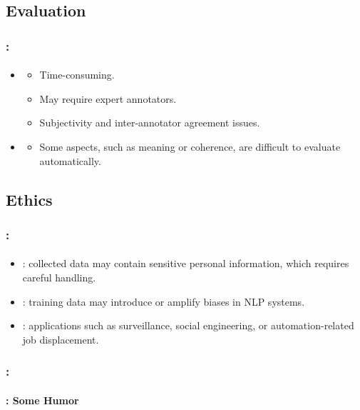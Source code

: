 \documentclass[xcolor=table]{beamer}
\begin{document}
\subsection{Evaluation}

\begin{frame}
	\frametitle{\insertshortsubtitle: \insertsection}
	\framesubtitle{\insertsubsection}
	
	\begin{itemize}
		\item {}
		\begin{itemize}
			\item Time-consuming.
			\item May require expert annotators.
			\item Subjectivity and inter-annotator agreement issues.
		\end{itemize}
		
		\item {}
		\begin{itemize}
			\item Some aspects, such as meaning or coherence, are difficult to evaluate automatically.
		\end{itemize}
	\end{itemize}

\end{frame}

\subsection{Ethics}

\begin{frame}
	\frametitle{\insertshortsubtitle: \insertsection}
	\framesubtitle{\insertsubsection}

	\begin{itemize}
		\item {}: collected data may contain sensitive personal information, which requires careful handling.
		
		\item {}: training data may introduce or amplify biases in NLP systems.
		
		\item {}: applications such as surveillance, social engineering, or automation-related job displacement.
	\end{itemize}
	

\end{frame}

\begin{frame}
	\frametitle{\insertshortsubtitle: \insertsection}
	\framesubtitle{\insertsubsection: Some Humor}

	\begin{center}
	\end{center}

\end{frame}

\end{document}
